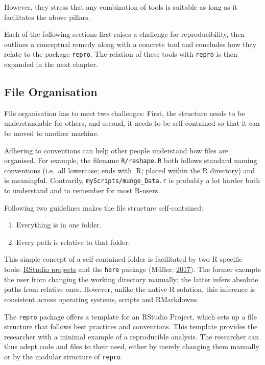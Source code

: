 \documentclass[12pt,a4paper,]{article}
\providecommand{\tightlist}{%
  \setlength{\itemsep}{0pt}\setlength{\parskip}{0pt}}
\begin{document}
However, they stress that any combination of tools is suitable as long as it facilitates the above pillars.

Each of the following sections first raises a challenge for reproducibility, then outlines a conceptual remedy along with a concrete tool and concludes how they relate to the package \texttt{repro}. The relation of these tools with \texttt{repro} is then expanded in the next chapter.

\hypertarget{file-organisation}{%
\subsection{File Organisation}\label{file-organisation}}

File organisation has to meet two challenges: First, the structure needs to be understandable for others, and second, it needs to be self-contained so that it can be moved to another machine.

Adhering to conventions can help other people understand how files are organised.
For example, the filename \texttt{R/reshape.R} both follows standard naming conventions (i.e.~all lowercase; ends with .R; placed within the R directory) and is meaningful. Contrarily, \texttt{myScripts/munge\_Data.r} is probably a lot harder both to understand and to remember for most R-users.

Following two guidelines makes the file structure self-contained:

\begin{enumerate}
\def\labelenumi{\arabic{enumi}.}
\tightlist
\item
  Everything is in one folder.
\item
  Every path is relative to that folder.
\end{enumerate}

This simple concept of a self-contained folder is facilitated by two R specific tools: \href{https://r4ds.had.co.nz/workflow-projects.html}{RStudio projects} and the \texttt{here} package (Müller, \protect\hyperlink{ref-R-here}{2017}).
The former exempts the user from changing the working directory manually; the latter infers absolute paths from relative ones.
However, unlike the native R solution, this inference is consistent across operating systems, scripts and RMarkdowns.

The \texttt{repro} package offers a template for an RStudio Project, which sets up a file structure that follows best practices and conventions.
This template provides the researcher with a minimal example of a reproducible analysis.
The researcher can thus adept code and files to their need, either by merely changing them manually or by the modular structure of \texttt{repro}.
\end{document}
